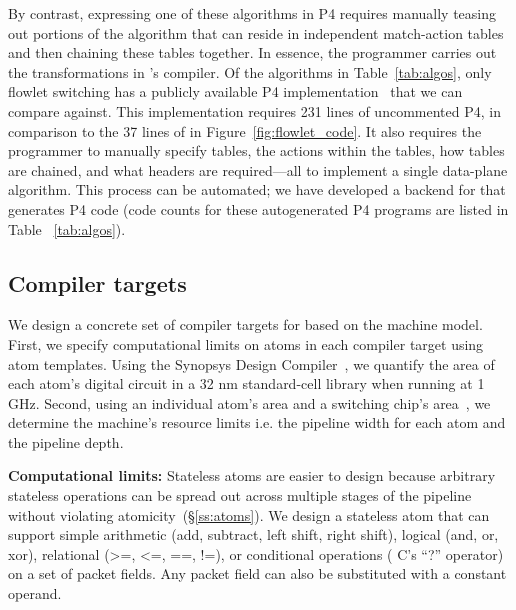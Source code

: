 By contrast, expressing one of these algorithms in P4 requires manually teasing
out portions of the algorithm that can reside in independent match-action
tables and then chaining these tables together. In essence, the programmer
carries out the transformations in \pktlanguage's compiler. Of the algorithms
in Table~\ref{tab:algos}, only flowlet switching has a publicly available P4
implementation~\cite{p4_flowlet} that we can compare against. This
implementation requires 231 lines of uncommented P4, in comparison to the 37
lines of \pktlanguage in Figure~\ref{fig:flowlet_code}. It also requires the
programmer to manually specify tables, the actions within the tables, how
tables are chained, and what headers are required---all to implement a single
data-plane algorithm. This process can be automated; we have developed a
backend for \pktlanguage that generates P4 code (code counts for these
autogenerated P4 programs are listed in Table ~\ref{tab:algos}).

\subsection{Compiler targets}
\label{ss:targets}

We design a concrete set of compiler targets for \pktlanguage based on the
\absmachine machine model. First, we specify computational limits on atoms in
each compiler target using atom templates. Using the Synopsys Design
Compiler~\cite{synopsys_dc}, we quantify the area of each atom's digital
circuit in a 32 nm standard-cell library when running at 1 GHz.  Second, using
an individual atom's area and a switching chip's area~\cite{gibb_parsing}, we
determine the machine's resource limits i.e. the pipeline width for each atom
and the pipeline depth.

\textbf{Computational limits:}
Stateless atoms are easier to design because arbitrary stateless operations can
be spread out across multiple stages of the pipeline without violating
atomicity~(\S\ref{ss:atoms}). We design a stateless atom that can support
simple arithmetic (add, subtract, left shift, right shift), logical (and, or,
xor), relational (>=, <=, ==, !=), or conditional operations ( C's ``?''
operator) on a set of packet fields. Any packet field can also be substituted
with a constant operand.

